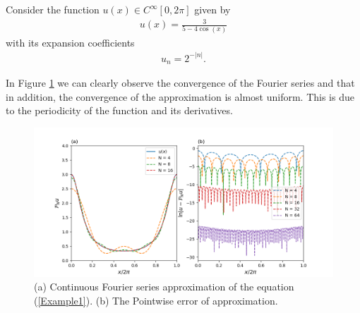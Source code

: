 	\begin{example}
	    Consider the function $u(x) \in C^{\infty} [0, 2 \pi]$ given by
    	\begin{align}
    		\label{Example1} 
    	    u(x) = \frac{3}{5 - 4 \cos(x)}   
    	\end{align}
    	with its expansion coefficients
    	\begin{align*}
    	     \hat{u}_{n} = 2^{-|n|}.
    	\end{align*}
    
    	In Figure \ref{fig1} we can clearly observe the convergence of the Fourier series and that in addition, the convergence of the approximation is almost uniform. This is due to the periodicity of the function and its derivatives.
    	
    	\begin{figure}[H]
        \includegraphics[width=\textwidth]{Figures/example23.png}
        \caption{(a) Continuous Fourier series approximation of the equation (\ref{Example1}). (b) The Pointwise error of approximation.}
        \label{fig1}
        \end{figure}
	\end{example} 
	
